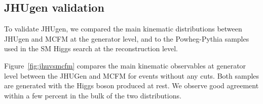\subsection{JHUgen validation}
\label{sec:jhugenval}

To validate JHUgen, we compared the main kinematic distributions between JHUgen and
MCFM at the generator level, and to the Powheg-Pythia samples used in the
SM Higgs search at the reconstruction level.

Figure~\ref{fig:jhuvsmcfm} compares the main kinematic observables at generator 
level between the JHUGen and MCFM for events without any cuts. 
Both samples are generated with the Higgs boson produced at rest. 
We observe good agreement within a few percent in the bulk of the two distributions. 


